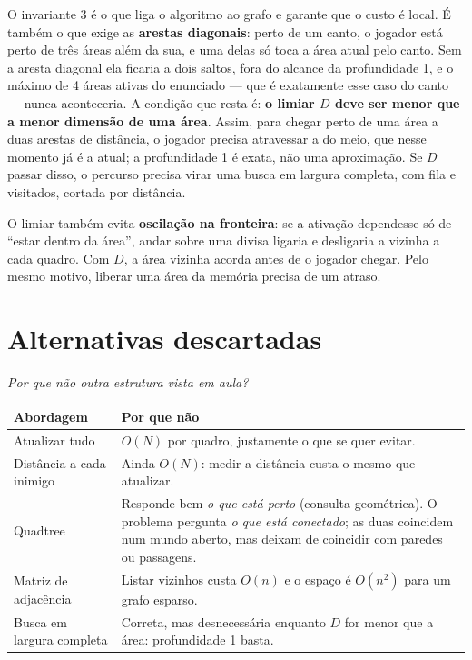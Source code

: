 \documentclass[11pt,a4paper]{article}
\newcommand{\gancho}[1]{\textcolor{destaque}{\textit{#1}}\par}
\begin{document}
O invariante 3 é o que liga o algoritmo ao grafo e garante que o custo é local.
É também o que exige as \textbf{arestas diagonais}: perto de um canto, o
jogador está perto de três áreas além da sua, e uma delas só toca a área atual
pelo canto. Sem a aresta diagonal ela ficaria a dois saltos, fora do alcance da
profundidade 1, e o máximo de 4 áreas ativas do enunciado --- que é exatamente
esse caso do canto --- nunca aconteceria. A condição que resta é: \textbf{o limiar $D$ deve ser menor que a menor
dimensão de uma área}. Assim, para chegar perto de uma área a duas arestas de
distância, o jogador precisa atravessar a do meio, que nesse momento já é a
atual; a profundidade 1 é exata, não uma aproximação. Se $D$ passar disso, o
percurso precisa virar uma busca em largura completa, com fila e visitados,
cortada por distância.

O limiar também evita \textbf{oscilação na fronteira}: se a ativação dependesse
só de ``estar dentro da área'', andar sobre uma divisa ligaria e desligaria a
vizinha a cada quadro. Com $D$, a área vizinha acorda antes de o jogador chegar.
Pelo mesmo motivo, liberar uma área da memória precisa de um atraso.

\section{Alternativas descartadas}

\gancho{Por que não outra estrutura vista em aula?}

\begin{center}
\begin{tabularx}{\textwidth}{@{}lX@{}}
\toprule
Abordagem & Por que não \\
\midrule
Atualizar tudo & $O(N)$ por quadro, justamente o que se quer evitar. \\
Distância a cada inimigo & Ainda $O(N)$: medir a distância custa o mesmo que atualizar. \\
Quadtree & Responde bem \emph{o que está perto} (consulta geométrica). O problema
  pergunta \emph{o que está conectado}; as duas coincidem num mundo aberto, mas
  deixam de coincidir com paredes ou passagens. \\
Matriz de adjacência & Listar vizinhos custa $O(n)$ e o espaço é $O(n^2)$ para
  um grafo esparso. \\
Busca em largura completa & Correta, mas desnecessária enquanto $D$ for menor
  que a área: profundidade 1 basta. \\
\bottomrule
\end{tabularx}
\end{center}
\end{document}
